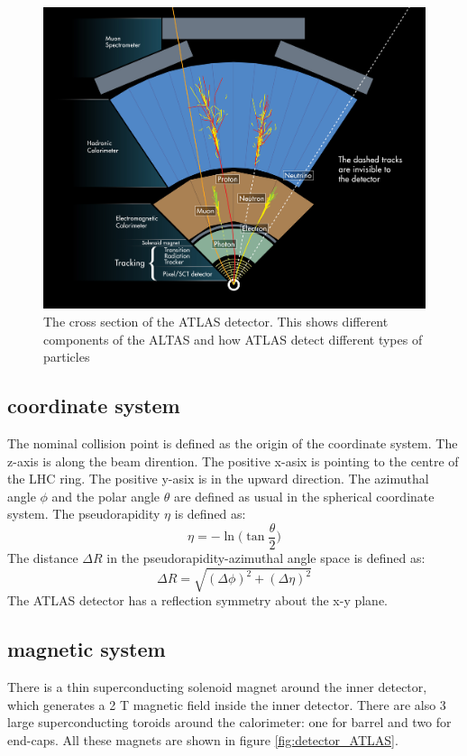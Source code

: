 \begin{figure}
\centering
\includegraphics[width=\textwidth]{data/photo/ATLAS_particles.jpg}
\caption{The cross section of the ATLAS detector. This shows different components of the ALTAS and how ATLAS detect different types of particles \cite{ATLAS_particles}}
\label{fig:ATLAS_particles}
\end{figure}

\subsection{coordinate system}
The nominal collision point is defined as the origin of the coordinate system.
The z-axis is along the beam dirention.
The positive x-asix is pointing to the centre of the LHC ring.
The positive y-asix is in the upward direction.
The azimuthal angle $\phi$ and the polar angle $\theta$ are defined as usual in the spherical coordinate system.
The pseudorapidity $\eta$ is defined as:
\begin{equation}
\eta = - \ln \Big( \tan \frac{\theta}{2} \Big)
\end{equation}
The distance $\Delta R$ in the pseudorapidity-azimuthal angle space is defined as:
\begin{equation}
\Delta R = \sqrt{(\Delta \phi) ^2 + (\Delta \eta) ^2}
\end{equation}
The ATLAS detector has a reflection symmetry about the x-y plane.

\subsection{magnetic system}
There is a thin superconducting solenoid magnet around the inner detector, which generates a 2 T magnetic field inside the inner detector.
There are also 3 large superconducting toroids around the calorimeter: one for barrel and two for end-caps.
All these magnets are shown in figure \ref{fig:detector_ATLAS}.


